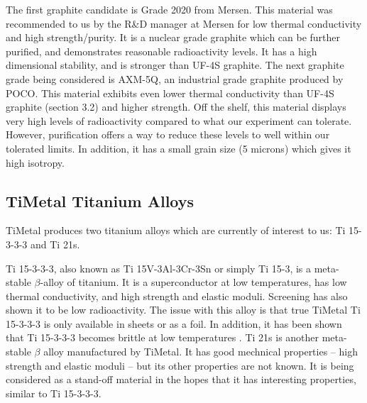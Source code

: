 \documentclass{report}
\begin{document}
The first graphite candidate is Grade 2020 from Mersen. This material was recommended to us by the R\&D manager at Mersen for low thermal conductivity and high strength/purity. It is a nuclear grade graphite which can be further purified, and demonstrates reasonable radioactivity levels. It has a high dimensional stability, and is stronger than UF-4S graphite.
The next graphite grade being considered is AXM-5Q\footnotemark, an industrial grade graphite produced by POCO. This material exhibits even lower thermal conductivity than UF-4S graphite (section 3.2) and higher strength. Off the shelf, this material displays very high levels of radioactivity compared to what our experiment can tolerate. However, purification offers a way to reduce these levels to well within our tolerated limits. In addition, it has a small grain size (5 microns) which gives it high isotropy.


\subsection{TiMetal Titanium Alloys}

TiMetal produces two titanium alloys which are currently of interest to us: Ti 15-3-3-3 and Ti 21s.

Ti 15-3-3-3, also known as Ti 15V-3Al-3Cr-3Sn or simply Ti 15-3, is a meta-stable $\beta$-alloy of titanium. It is a superconductor at low temperatures, has low thermal conductivity, and high strength and elastic moduli. Screening has also shown it to be low radioactivity. The issue with this alloy is that true TiMetal Ti 15-3-3-3 is only available in sheets or as a foil. In addition, it has been shown that Ti 15-3-3-3 becomes brittle at low temperatures \cite{James2012}. Ti 21s is another meta-stable $\beta$ alloy manufactured by TiMetal. It has good mechnical properties -- high strength and elastic moduli -- but its other properties are not known. It is being considered as a stand-off material in the hopes that it has interesting properties, similar to Ti 15-3-3-3.
\end{document}
